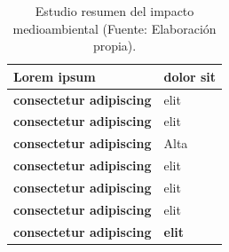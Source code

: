 \begin{table}[htbp]

\begin{center}

\begin{tabular}{|m{7cm}| m{7cm} |}

\hline

\rowcolor{Cyan}

\centering \textbf{Lorem ipsum} & \hspace{20pt}

\textbf{dolor sit} \\\hline

\textbf{consectetur adipiscing} & elit\\ \hline
\rowcolor{GrisTabla}
\textbf{consectetur adipiscing} & elit \\ \hline
\textbf{consectetur adipiscing} & Alta \\ \hline
\rowcolor{GrisTabla} 
\textbf{consectetur adipiscing} & elit \\ \hline
\textbf{consectetur adipiscing} & elit  \\ \hline
\rowcolor{GrisTabla} 
\textbf{consectetur adipiscing} & elit \\ \hline
\rowcolor{Naranja} 
\textbf{consectetur adipiscing} & \textbf{elit} \\ \hline
\end{tabular}

\caption{Estudio resumen del impacto medioambiental (Fuente: Elaboración propia).}

\label{Medioambiente}

\end{center}

\end{table}
